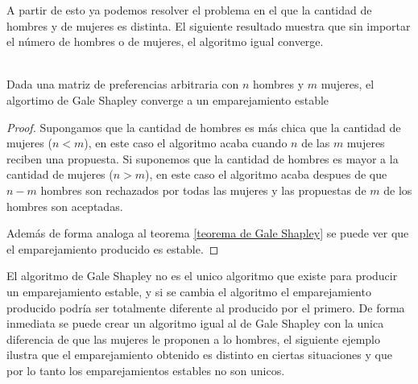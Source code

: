 A partir de esto ya podemos resolver el problema en el que la cantidad de hombres y de mujeres es distinta. El siguiente resultado muestra que sin importar el número de hombres o de mujeres, el algoritmo igual converge. 

\begin{teo} \cite{GaleShapley} \\
Dada una matriz de preferencias arbitraria con $n$ hombres y $m$ mujeres, el algortimo de Gale Shapley converge a un emparejamiento estable
\end{teo}
\begin{proof}
Supongamos que la cantidad de hombres es más chica que la cantidad de mujeres ($n<m$), en este caso el algoritmo acaba cuando $n$ de las $m$ mujeres reciben una propuesta. Si suponemos que la cantidad de hombres es mayor a la cantidad de mujeres ($n>m$), en este caso el algoritmo acaba despues de que $n-m$ hombres son rechazados por todas las mujeres y las propuestas de $m$ de los hombres son aceptadas. 

Además de forma analoga al teorema \ref{teorema de Gale Shapley} se puede ver que el emparejamiento producido es estable.
\end{proof}

El algoritmo de Gale Shapley no es el unico algoritmo que existe para producir un emparejamiento estable, y si se cambia el algoritmo el emparejamiento producido podría ser totalmente diferente al producido por el primero. De forma inmediata se puede crear un algoritmo igual al de Gale Shapley con la unica diferencia de que las mujeres le proponen a lo hombres, el siguiente ejemplo ilustra que el emparejamiento obtenido es distinto en ciertas situaciones y que por lo tanto los emparejamientos estables no son unicos. 

